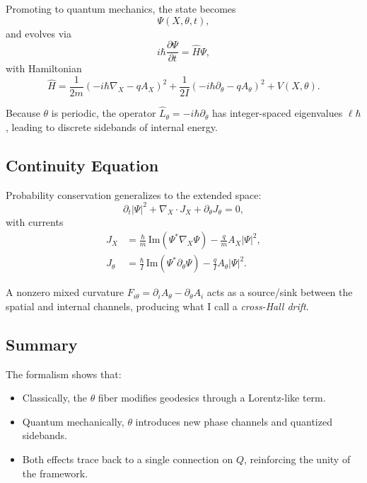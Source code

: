 Promoting to quantum mechanics, the state becomes
\[
\Psi(X,\theta,t),
\]
and evolves via
\begin{equation}
i\hbar \frac{\partial \Psi}{\partial t} = \hat{H} \Psi,
\end{equation}
with Hamiltonian
\begin{equation}
\hat{H} = \frac{1}{2m} \left(-i\hbar\nabla_X - q A_X \right)^2
         + \frac{1}{2I} \left(-i\hbar \partial_\theta - q A_\theta \right)^2
         + V(X,\theta).
\end{equation}

Because $\theta$ is periodic, the operator $\hat{L}_\theta = -i\hbar \partial_\theta$
has integer-spaced eigenvalues $\ell \hbar$, leading to discrete sidebands of internal energy.

\subsection{Continuity Equation}

Probability conservation generalizes to the extended space:
\begin{equation}
\partial_t |\Psi|^2 + \nabla_X \cdot J_X + \partial_\theta J_\theta = 0,
\end{equation}
with currents
\begin{align}
J_X &= \frac{\hbar}{m} \,\text{Im}(\Psi^* \nabla_X \Psi) - \frac{q}{m} A_X |\Psi|^2, \\
J_\theta &= \frac{\hbar}{I} \,\text{Im}(\Psi^* \partial_\theta \Psi) - \frac{q}{I} A_\theta |\Psi|^2.
\end{align}

A nonzero mixed curvature $F_{i\theta} = \partial_i A_\theta - \partial_\theta A_i$
acts as a source/sink between the spatial and internal channels, producing what I call
a \emph{cross-Hall drift}.

\subsection{Summary}

The formalism shows that:
\begin{itemize}
  \item Classically, the $\theta$ fiber modifies geodesics through a Lorentz-like term.
  \item Quantum mechanically, $\theta$ introduces new phase channels and quantized sidebands.
  \item Both effects trace back to a single connection on $Q$, reinforcing the unity of the framework.
\end{itemize}
